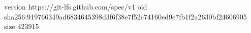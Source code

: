 version https://git-lfs.github.com/spec/v1
oid sha256:919766349ad6834645398d3f6f38e7f52c74160ed9e7fb1f2a2630bf24606905
size 423915
